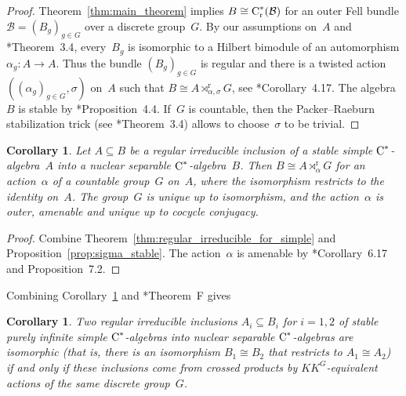 \documentclass[a4paper]{amsart}
\theoremstyle{plain}
\newtheorem{corollary}[theorem]{Corollary}
\theoremstyle{definition}
\theoremstyle{remark}
\numberwithin{theorem}{section}
\numberwithin{equation}{section}
\newcommand*{\nb}{\nobreakdash}
\newcommand*{\red}{\mathrm{r}}%
\newcommand*{\Cst}{\textup C^*}%
\newcommand*{\B}{\mathcal B}%
\begin{document}
\begin{proof}
  Theorem~\ref{thm:main_theorem} implies \(B\cong \Cst_\red(\B)\)  for
  an outer Fell bundle \(\B=(B_g)_{g\in G}\) over a discrete
  group~\(G\).
  By our assumptions on~\(A\)  and
  \cite{Brown-Green-Rieffel:Stable}*{Theorem~3.4}, every~\(B_g\) is
  isomorphic to a Hilbert bimodule of an automorphism \(\alpha_g\colon
  A\to A\).
  Thus the bundle \((B_g)_{g\in G}\) is regular and there is a twisted
  action \(((\alpha_g)_{g\in G}, \sigma)\) on~\(A\) such that \(B\cong
  A\rtimes^\red_{\alpha,\sigma}  G\), see
  \cite{BussExel:Regular.Fell.Bundle}*{Corollary~4.17}.
  The algebra~\(B\) is stable by
  \cite{Hjelmborg-Rordam:Stability}*{Proposition~4.4}.
  If~\(G\) is countable, then the Packer--Raeburn stabilization trick
  (see \cite{Packer-Raeburn:Stabilisation}*{Theorem~3.4}) allows to
  choose~\(\sigma\) to be trivial.
\end{proof}

\begin{corollary}
  \label{cor:Gabe_Szabo_actions}
  Let \(A\subseteq B\) be a regular irreducible inclusion of a stable
simple  \(\Cst\)\nb-algebra~\(A\) into a nuclear separable
  \(\Cst\)\nb-algebra~\(B\).
  Then \(B\cong A\rtimes^\red_\alpha  G\) for an action~\(\alpha\) of
  a countable group~\(G\) on~\(A\), where the isomorphism restricts to
  the identity on~\(A\).
  The group~\(G\) is unique up to isomorphism, and the
  action~\(\alpha\) is outer, amenable and unique up to cocycle
  conjugacy.
\end{corollary}

\begin{proof}
  Combine Theorem~\ref{thm:regular_irreducible_for_simple} and
  Proposition~\ref{prop:sigma_stable}.
  The action~\(\alpha\) is amenable by
  \cite{Abadie-Buss-Ferraro:Amenability}*{Corollary~6.17 and
    Proposition~7.2}.
\end{proof}

Combining Corollary~\ref{cor:Gabe_Szabo_actions} and
\cite{Gabe-Szabo:Dynamical_Kirchberg}*{Theorem~F} gives

\begin{corollary}
  \label{cor:Gabe_Szabo_inclusions}
  Two regular irreducible inclusions \(A_i\subseteq B_i\) for
  \(i=1,2\) of stable purely infinite simple \(\Cst\)\nb-algebras into
  nuclear separable \(\Cst\)\nb-algebras are isomorphic
  \textup{(}that is, there is an isomorphism \(B_1\cong B_2\) that
  restricts to \(A_1\cong A_2\)\textup{)} if and only if these
  inclusions come from crossed products by \(KK^G\)-equivalent actions
  of the same discrete group~\(G\).
\end{corollary}
\end{document}
